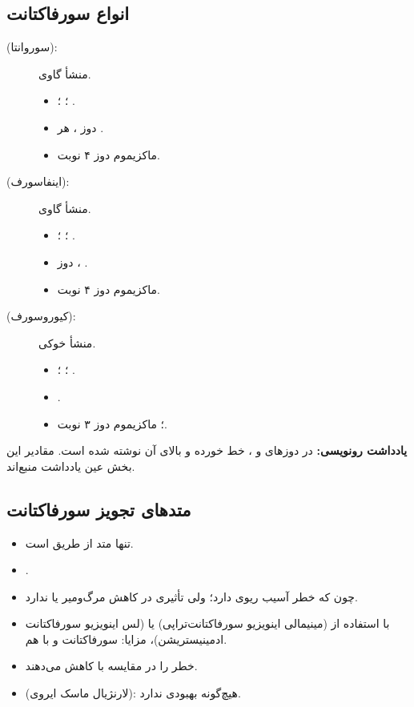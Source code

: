 \documentclass[12pt,a4paper]{article}
\begin{document}
\subsection*{انواع سورفاکتانت}
\begin{description}
\item[ (سوروانتا):] منشأ گاوی.
\begin{itemize}
\item {}؛ ؛  .
\item دوز ، هر .
\item ماکزیموم دوز ۴ نوبت.
\end{itemize}
\item[ (اینفاسورف):] منشأ گاوی.
\begin{itemize}
\item {}؛ ؛ .
\item دوز ، .
\item ماکزیموم دوز ۴ نوبت.
\end{itemize}
\item[ (کیوروسورف):] منشأ خوکی.
\begin{itemize}
\item {}؛ ؛ .
\item {}.
\item {}؛ ماکزیموم دوز ۳ نوبت.
\end{itemize}
\end{description}
\textbf{یادداشت رونویسی:} در دوزهای  و ،  خط خورده و  بالای آن نوشته شده است. مقادیر این بخش عین یادداشت منبع‌اند.
\subsection*{متدهای تجویز سورفاکتانت}
\begin{itemize}
\item تنها متد  از طریق  است.
\item {}.
\item چون که  خطر آسیب ریوی دارد؛ ولی تأثیری در کاهش مرگ‌ومیر یا  ندارد.
\item با استفاده از  (مینیمالی اینویزیو سورفاکتانت‌تراپی) یا  (لس اینویزیو سورفاکتانت ادمینیستریشن)، مزایا: سورفاکتانت و  با هم.
\item خطر  را در مقایسه با  کاهش می‌دهند.
\item {} (لارنژیال ماسک ایروی): هیچ‌گونه بهبودی ندارد.
\end{itemize}
\end{document}
